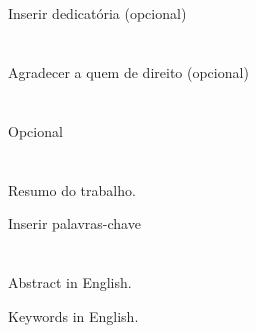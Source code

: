 \documentclass[11pt,twoside]{estiloUBI}
\begin{document}
\onehalfspacing
{}

\pagestyle{fancy}

\cleardoublepage

\newpage
\section*{}
\vspace{0.5cm}
Inserir dedicatória (opcional)
\cleardoublepage

\newpage
\section*{}
\vspace{0.5cm}
Agradecer a quem de direito (opcional)
\cleardoublepage

\newpage
\section*{}
\vspace{0.5cm}
Opcional
\cleardoublepage

\newpage
\section*{}
\vspace{0.5cm}
Resumo do trabalho.

\vspace{2.2cm}
{}

\vspace{0.8cm}
Inserir palavras-chave
\cleardoublepage

\newpage
\section*{}
\vspace{0.5cm}
Abstract in English.

\vspace{2.2cm}
{}

\vspace{0.8cm}
Keywords in English.
\cleardoublepage

\tableofcontents

\listoffigures
\cleardoublepage

\listoftables
\cleardoublepage

\newpage

\cleardoublepage

\mainmatter




\cleardoublepage
{}



\cleardoublepage

\printindex
\end{document}
